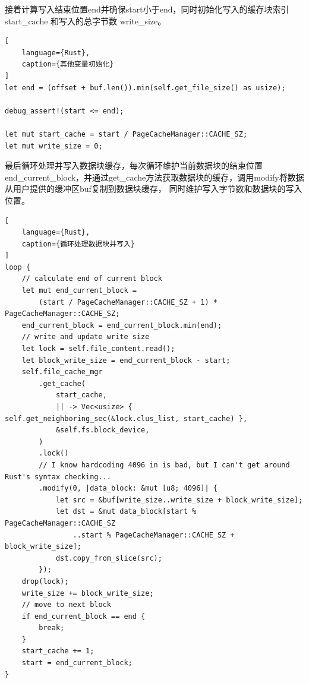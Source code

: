接着计算写入结束位置end并确保start小于end，同时初始化写入的缓存块索引 start_cache 和写入的总字节数 write_size。

\begin{lstlisting}[
    language={Rust},
    caption={其他变量初始化}
]
let end = (offset + buf.len()).min(self.get_file_size() as usize);

debug_assert!(start <= end);

let mut start_cache = start / PageCacheManager::CACHE_SZ;
let mut write_size = 0;
\end{lstlisting}

最后循环处理并写入数据块缓存，每次循环维护当前数据块的结束位置end_current_block，并通过get_cache方法获取数据块的缓存，调用modify将数据从用户提供的缓冲区buf复制到数据块缓存，
同时维护写入字节数和数据块的写入位置。

\begin{lstlisting}[
    language={Rust},
    caption={循环处理数据块并写入}
]
loop {
    // calculate end of current block
    let mut end_current_block =
        (start / PageCacheManager::CACHE_SZ + 1) * PageCacheManager::CACHE_SZ;
    end_current_block = end_current_block.min(end);
    // write and update write size
    let lock = self.file_content.read();
    let block_write_size = end_current_block - start;
    self.file_cache_mgr
        .get_cache(
            start_cache,
            || -> Vec<usize> { self.get_neighboring_sec(&lock.clus_list, start_cache) },
            &self.fs.block_device,
        )
        .lock()
        // I know hardcoding 4096 in is bad, but I can't get around Rust's syntax checking...
        .modify(0, |data_block: &mut [u8; 4096]| {
            let src = &buf[write_size..write_size + block_write_size];
            let dst = &mut data_block[start % PageCacheManager::CACHE_SZ
                ..start % PageCacheManager::CACHE_SZ + block_write_size];
            dst.copy_from_slice(src);
        });
    drop(lock);
    write_size += block_write_size;
    // move to next block
    if end_current_block == end {
        break;
    }
    start_cache += 1;
    start = end_current_block;
}
\end{lstlisting}